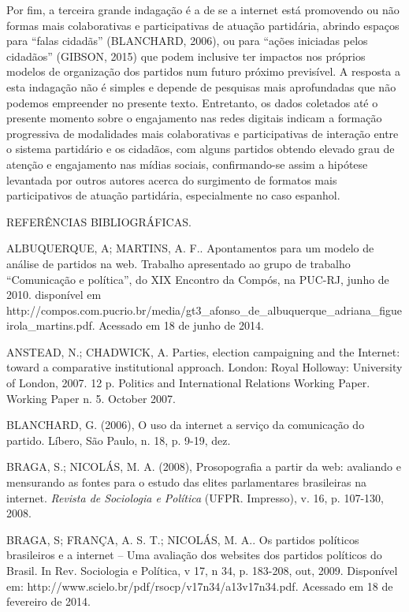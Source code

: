 Por fim, a terceira grande indagação é a de se a internet está
promovendo ou não formas mais colaborativas e participativas de atuação
partidária, abrindo espaços para ``falas cidadãs'' (BLANCHARD, 2006), ou
para ``ações iniciadas pelos cidadãos'' (GIBSON, 2015) que podem
inclusive ter impactos nos próprios modelos de organização dos partidos
num futuro próximo previsível. A resposta a esta indagação não é simples
e depende de pesquisas mais aprofundadas que não podemos empreender no
presente texto. Entretanto, os dados coletados até o presente momento
sobre o engajamento nas redes digitais indicam a formação progressiva de
modalidades mais colaborativas e participativas de interação entre o
sistema partidário e os cidadãos, com alguns partidos obtendo elevado
grau de atenção e engajamento nas mídias sociais, confirmando-se assim a
hipótese levantada por outros autores acerca do surgimento de formatos
mais participativos de atuação partidária, especialmente no caso
espanhol.

REFERÊNCIAS BIBLIOGRÁFICAS.

ALBUQUERQUE, A; MARTINS, A. F.. Apontamentos para um modelo de análise
de partidos na web. Trabalho apresentado ao grupo de trabalho
``Comunicação e política'', do XIX Encontro da Compós, na PUC-RJ, junho
de 2010. disponível em
http://compos.com.pucrio.br/media/gt3\_afonso\_de\_albuquerque\_adriana\_figueirola\_martins.pdf.
Acessado em 18 de junho de 2014.

ANSTEAD, N.; CHADWICK, A. Parties, election campaigning and the
Internet: toward a comparative institutional approach. London: Royal
Holloway: University of London, 2007. 12 p. Politics and International
Relations Working Paper. Working Paper n. 5. October 2007.

BLANCHARD, G. (2006), O uso da internet a serviço da comunicação do
partido. Líbero, São Paulo, n. 18, p. 9-19, dez.

BRAGA, S.; NICOLÁS, M. A. (2008), Prosopografia a partir da web:
avaliando e mensurando as fontes para o estudo das elites parlamentares
brasileiras na internet. \emph{Revista de Sociologia e Política} (UFPR.
Impresso), v. 16, p. 107-130, 2008.

BRAGA, S; FRANÇA, A. S. T.; NICOLÁS, M. A.. Os partidos políticos
brasileiros e a internet -- Uma avaliação dos websites dos partidos
políticos do Brasil. In Rev. Sociologia e Política, v 17, n 34, p.
183-208, out, 2009. Disponível em:
http://www.scielo.br/pdf/rsocp/v17n34/a13v17n34.pdf. Acessado em 18 de
fevereiro de 2014.

